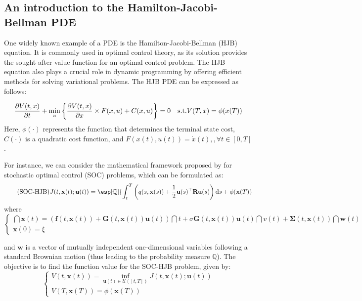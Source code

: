 \documentclass{article}
\begin{document}
\subsection{An introduction to the Hamilton-Jacobi-Bellman PDE}

One widely known example of a PDE is the Hamilton-Jacobi-Bellman (HJB) equation. It is commonly used in optimal control theory, as its solution provides the sought-after value function for an optimal control problem. The HJB equation also plays a crucial role in dynamic programming by offering efficient methods for solving variational problems. The HJB PDE can be expressed as follows:


\begin{equation}
\frac{\partial V(t,x)}{\partial t} + \min_u\left\lbrace \frac{\partial V(t,x)}{\partial x}\times F(x,u) + C(x,u) \right\rbrace = 0
\quad \mathrm{s.t. } V(T,x) = \phi(x(T))
\end{equation}
Here, $\phi(\cdot)$ represents the function that determines the terminal state cost, $C(\cdot)$ is a quadratic cost function, and $F(x(t),u(t)) = \dot{x}(t),, \forall t \in [0,T]$.

For instance, we can consider the mathematical framework proposed by \cite{pereira2019deep} for stochastic optimal control (SOC) problems, which can be formulated as:
\begin{equation}
    \label{eq:SOC-HJB}\tag{SOC-HJB}
    J(t,\mathbf{x}(t);\mathbf{u}(t)) = \esp[\Q]{\int_t^T\pars{q(s,\mathbf{x}(s)) + \frac{1}{2}\mathbf{u}(s)^\top\mathbf{R}\mathbf{u}(s)}\dint s + \phi(\mathbf{x}(T)}
\end{equation}
where
\begin{equation*}
    \begin{cases}
        \displaystyle \dint\mathbf{x}(t)
        = (\mathbf{f}(t,\mathbf{x}(t))
        + \mathbf{G}(t,\mathbf{x}(t))\mathbf{u}(t)) \dint t
        + \sigma \mathbf{G}(t,\mathbf{x}(t))\mathbf{u}(t)\dint v(t)
        + \mathbf{\Sigma}(t,\mathbf{x}(t)) \dint
        \mathbf{w}(t) \\[5pt]
        \displaystyle \mathbf{x}(0) = \xi
    \end{cases}
\end{equation*}

and $\mathbf{w}$ is a vector of mutually independent one-dimensional variables following a standard Brownian motion (thus leading to the probability measure $\mathbb{Q}$). The objective is to find the function value for the SOC-HJB problem, given by:
\begin{equation}
    \begin{cases}
        \displaystyle V(t,\mathbf{x}(t))
        = \inf_{\mathbf{u}(t)\in\mathcal{U}([t,T])}
        J(t,\mathbf{x}(t) ;\mathbf{u}(t))
        \\[7pt]
        \displaystyle V(T,\mathbf{x}(T)) = \phi(\mathbf{x}(T))
    \end{cases}
\end{equation}
\end{document}
